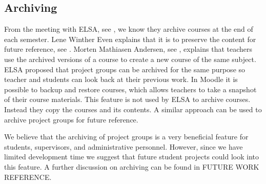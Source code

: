 \subsection{Archiving}
\label{sub:analysarchiving}
From the meeting with ELSA, see , we know they archive courses at the end of each semester. 
Lene Winther Even explains that it is to preserve the content for future reference, see . 
Morten Mathiasen Andersen, see , explains that teachers use the archived versions of a course to create a new course of the same subject. 
ELSA proposed that project groups can be archived for the same purpose so teacher and students can look back at their previous work.
In Moodle it is possible to backup and restore courses, which allows teachers to take a snapshot of their course materials. 
This feature is not used by ELSA to archive courses.
Instead they copy the courses and its contents.
A similar approach can be used to archive project groups for future reference. 

We believe that the archiving of project groups is a very beneficial feature for students, supervisors, and administrative personnel.
However, since we have limited development time we suggest that future student projects could look into this feature.
A further discussion on archiving can be found in FUTURE WORK REFERENCE. 
